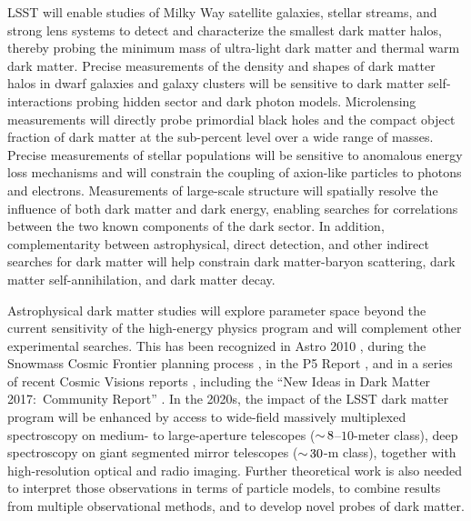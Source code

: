 \documentclass[12pt]{article}
\begin{document}
LSST will enable studies of Milky Way satellite galaxies, stellar streams, and strong lens systems to detect and characterize the smallest dark matter halos, thereby probing the minimum mass of ultra-light dark matter and thermal warm dark matter.
Precise measurements of the density and shapes of dark matter halos in dwarf galaxies and galaxy clusters will be sensitive to dark matter self-interactions probing hidden sector and dark photon models.
Microlensing measurements will directly probe primordial black holes and the compact object fraction of dark matter at the sub-percent level over a wide range of masses.
Precise measurements of stellar populations will be sensitive to anomalous energy loss mechanisms and will constrain the coupling of axion-like particles to photons and electrons.
Measurements of large-scale structure will spatially resolve the influence of both dark matter and dark energy, enabling searches for correlations between the two known components of the dark sector.
In addition, complementarity between astrophysical, direct detection, and other indirect searches for dark matter will help constrain dark matter-baryon scattering, dark matter self-annihilation, and dark matter decay. 

Astrophysical dark matter studies will explore parameter space beyond the current sensitivity of the high-energy physics program and will complement other experimental searches.
This has been recognized in Astro 2010 \citep{Astro2010}, during the Snowmass Cosmic Frontier planning process \citep[][]{1310.8642, 1310.5662, 1305.1605}, in the P5 Report \citep[]{P5Report}, and in a series of recent Cosmic Visions reports \citep[][]{1604.07626,1802.07216}, including the ``New Ideas in Dark Matter 2017:\ Community Report'' \citep{Battaglieri:2017aum}.
In the 2020s, the impact of the LSST dark matter program will be enhanced by access to wide-field massively multiplexed spectroscopy on medium- to large-aperture telescopes ($ {\sim}\, 8$--$10$-meter class), deep spectroscopy on giant segmented mirror telescopes ($ {\sim}\, 30$-m class), together with high-resolution optical and radio imaging.
Further theoretical work is also needed to interpret those observations in terms of particle models, to combine results from multiple observational methods, and to develop novel probes of dark matter.
\end{document}
